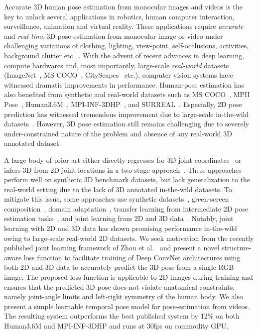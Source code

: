 \documentclass[runningheads]{llncs}
\begin{document}
Accurate 3D human pose estimation from monocular images and videos is the key to unlock several applications in robotics, human computer interaction, surveillance, animation and virtual reality. These applications require \emph{accurate} and \emph{real-time} 3D pose estimation from monocular image or video under challenging variations of clothing, lighting, view-point, self-occlusions, activities, background clutter etc.~\cite{sminchisescu2003estimating,SARAFIANOS20161}. With the advent of recent advances in deep learning, compute hardwares and, most importantly, large-scale \emph{real-world} datasets (ImageNet~\cite{2014arXiv1409.0575R}, MS COCO~\cite{MSCOCO:2014}, CityScapes~\cite{cordts2016cityscapes} etc.), computer vision systems have witnessed dramatic improvements in performance. Human-pose estimation has also benefited from synthetic and real-world datasets such as MS COCO~\cite{MSCOCO:2014}, MPII Pose~\cite{andriluka14cvpr}, Human3.6M~\cite{h36m_pami,IonescuSminchisescu11}, MPI-INF-3DHP~\cite{mono-3dhp2017}, and SURREAL~\cite{Varol_2017_CVPR}. Especially, 2D pose prediction has witnessed tremendous improvement due to large-scale in-the-wild datasets~\cite{MSCOCO:2014,andriluka14cvpr}. However, 3D pose estimation still remains challenging due to severely under-constrained nature of the problem and absence of any real-world 3D annotated dataset.


A large body of prior art either directly regresses for 3D joint coordinates~\cite{li20143d,Li_2015_ICCV,Sun_2017_ICCV} or infers 3D from 2D joint-locations in a two-stage approach~\cite{mono-3dhp2017,Moreno-Noguer_2017_CVPR,Lin_2017_CVPR,zhou2016sparseness,Zhou_2017_ICCV}. These approaches perform well on synthetic 3D benchmark datasets, but lack generalization to the real-world setting due to the lack of 3D annotated in-the-wild datasets. 
To mitigate this issue, some approaches use synthetic datasets~\cite{ChenWLSWTLCC16,Varol_2017_CVPR}, green-screen composition~\cite{mono-3dhp2017,VNect_SIGGRAPH2017}, domain adaptation~\cite{ChenWLSWTLCC16}, transfer learning from intermediate 2D pose estimation tasks~\cite{mono-3dhp2017,li20143d}, and joint learning from 2D and 3D data~\cite{Zhou_2017_ICCV,Sun_2017_ICCV}. Notably, joint learning with 2D and 3D data has shown promising performance in-the-wild owing to large-scale real-world 2D datasets. We seek motivation from the recently published joint learning framework of Zhou et al.~\cite{Zhou_2017_ICCV} and present a novel structure-aware loss function to facilitate training of Deep ConvNet architectures using both 2D and 3D data to accurately predict the 3D pose from a single RGB image. The proposed loss function is applicable to 2D images during training and ensures that the predicted 3D pose does not violate anatomical constraints, namely joint-angle limits and left-right symmetry of the human body. We also present a simple learnable temporal pose model for pose-estimation from videos. The resulting system outperforms the best published system by 12\% on both Human3.6M and MPI-INF-3DHP and runs at 30fps on commodity GPU.
\end{document}
